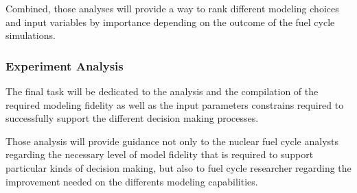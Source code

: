 Combined, those analyses will provide a way to rank different modeling choices
and input variables by importance depending on the outcome of the fuel cycle
simulations.


\subsubsection{Experiment Analysis}

The final task will be dedicated to the analysis and the compilation of the
required modeling fidelity as well as the input parameters constrains required
to successfully support the different decision making processes.

Those analysis will provide guidance not only to the nuclear fuel cycle analysts
regarding the necessary level of model fidelity that is required to support
particular kinds of decision making, but also to fuel cycle researcher regarding
the improvement needed on the differents modeling capabilities.
